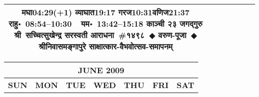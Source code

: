 \documentclass[a3paper,12pt,landscape]{article}
\newcommand{\eventsep}{~$\Diamondblack$ }
\newcommand{\To}{\hspace{1pt}\raisebox{0pt}{\tiny\RIGHTarrow}\hspace{1pt}}
\newcommand{\rahuyama}[2]{%
{राहु॰~\textsf{#1}~~यम॰~\textsf{#2}}
}
\begin{document}
\begin{center}
\begin{tabular}{|c|c|c|c|c|c|c|}
{{\mbox{मघा\To{}\textsf{04:29(+1)\hspace{2ex}}}}%
{\mbox{व्याघात\To{}\textsf{19:17\hspace{2ex}}}}%
{\mbox{गरज\To{}\textsf{10:31\hspace{2ex}}}\mbox{वणिज\To{}\textsf{21:37\hspace{2ex}}}}}%
{\rahuyama{08:54--10:30}{13:42--15:18}}%
{काञ्ची २३ जगद्गुरु श्री~सच्चित्सुखेन्द्र सरस्वती आराधना~\#{१४९८}\eventsep वरुण-पूजा\eventsep श्रीनिवासमङ्गापुरे साक्षात्कार-वैभवोत्सव-समापनम्}
\\ \hline %
\end{tabular}



\begin{tabular}{|c|c|c|c|c|c|c|}
\multicolumn{7}{c}{\Large \bfseries \sffamily JUNE 2009}\\[3mm]
\hline
\textbf{\textsf{SUN}} & \textbf{\textsf{MON}} & \textbf{\textsf{TUE}} & \textbf{\textsf{WED}} & \textbf{\textsf{THU}} & \textbf{\textsf{FRI}} & \textbf{\textsf{SAT}} \\ \hline


\end{tabular}
\end{center}
\end{document}
